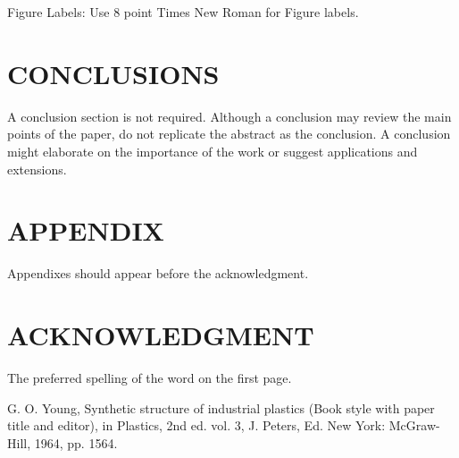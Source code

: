 \documentclass[letterpaper, 10 pt, conference]{ieeeconf}  %
\begin{document}
Figure Labels: Use 8 point Times New Roman for Figure labels. 

\section{CONCLUSIONS}

A conclusion section is not required. Although a conclusion may review the main points of the paper, do not replicate the abstract as the conclusion. A conclusion might elaborate on the importance of the work or suggest applications and extensions. 

\addtolength{\textheight}{-12cm}  

\section*{APPENDIX}

Appendixes should appear before the acknowledgment.

\section*{ACKNOWLEDGMENT}

The preferred spelling of the word on the first page.


\begin{thebibliography}{99}

 G. O. Young, Synthetic structure of industrial plastics (Book style with paper title and editor), in Plastics, 2nd ed. vol. 3, J. Peters, Ed.  New York: McGraw-Hill, 1964, pp. 1564.

\end{thebibliography}
\end{document}
